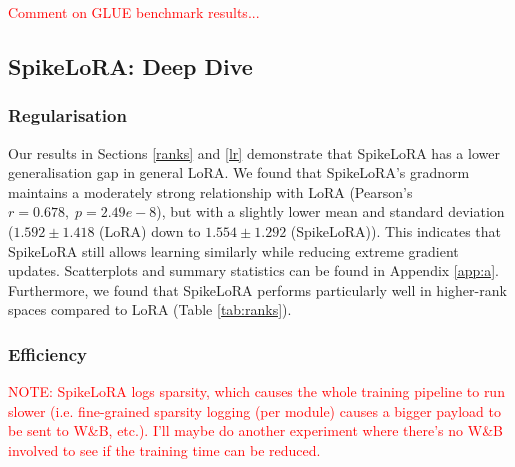 \documentclass{article} %
\begin{document}
\begin{table}[htbp]
  \centering
  \caption{Sparsity in the low-rank space after applying gating with the LIF neuron.}
  \label{tab:sparsity}
\end{table}

\textcolor{red}{Comment on GLUE benchmark results...}

\subsection{SpikeLoRA: Deep Dive}
\label{deepdive}
\subsubsection{Regularisation}
\label{regulariser}
Our results in Sections \ref{ranks} and \ref{lr} demonstrate that SpikeLoRA has a lower generalisation gap in general LoRA. We found that SpikeLoRA's gradnorm maintains a moderately strong relationship with LoRA (Pearson's \(r=0.678, \; p=2.49e-8\)), but with a slightly lower mean and standard deviation (\(1.592\pm 1.418\) (LoRA) down to \(1.554\pm 1.292\) (SpikeLoRA)). This indicates that SpikeLoRA still allows learning similarly while reducing extreme gradient updates. Scatterplots and summary statistics can be found in Appendix \ref{app:a}. Furthermore, we found that SpikeLoRA performs particularly well in higher-rank spaces compared to LoRA (Table \ref{tab:ranks}).

\subsubsection{Efficiency}
\label{energy}
\textcolor{red}{NOTE: SpikeLoRA logs sparsity, which causes the whole training pipeline to run slower (i.e. fine-grained sparsity logging (per module) causes a bigger payload to be sent to W\&B, etc.). I'll maybe do another experiment where there's no W\&B involved to see if the training time can be reduced.}
\end{document}
